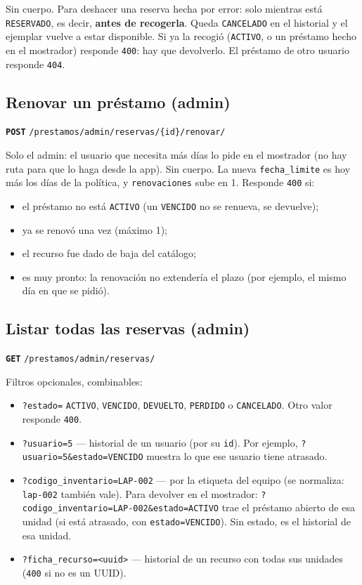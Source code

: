 \documentclass[11pt]{article}
\newcommand{\us}{\_\allowbreak}
\newcommand{\metodo}[2]{\textbf{\texttt{#1}} \texttt{#2}}
\begin{document}
Sin cuerpo. Para deshacer una reserva hecha por error: solo mientras est\'a \texttt{RESERVADO}, es decir, \textbf{antes de recogerla}. Queda \texttt{CANCELADO} en el historial y el ejemplar vuelve a estar disponible. Si ya la recogi\'o (\texttt{ACTIVO}, o un pr\'estamo hecho en el mostrador) responde \texttt{400}: hay que devolverlo. El pr\'estamo de otro usuario responde \texttt{404}.

\subsection*{Renovar un pr\'estamo (admin)}
\metodo{POST}{/prestamos/admin/reservas/\{id\}/renovar/}

Solo el admin: el usuario que necesita m\'as d\'ias lo pide en el mostrador (no hay ruta para que lo haga desde la app). Sin cuerpo. La nueva \texttt{fecha\us limite} es hoy m\'as los d\'ias de la pol\'itica, y \texttt{renovaciones} sube en 1. Responde \texttt{400} si:
\begin{itemize}
    \item el pr\'estamo no est\'a \texttt{ACTIVO} (un \texttt{VENCIDO} no se renueva, se devuelve);
    \item ya se renov\'o una vez (m\'aximo 1);
    \item el recurso fue dado de baja del cat\'alogo;
    \item es muy pronto: la renovaci\'on no extender\'ia el plazo (por ejemplo, el mismo d\'ia en que se pidi\'o).
\end{itemize}

\subsection*{Listar todas las reservas (admin)}
\metodo{GET}{/prestamos/admin/reservas/}

Filtros opcionales, combinables:
\begin{itemize}
    \item \texttt{?estado=} \texttt{ACTIVO}, \texttt{VENCIDO}, \texttt{DEVUELTO}, \texttt{PERDIDO} o \texttt{CANCELADO}. Otro valor responde \texttt{400}.
    \item \texttt{?usuario=5} --- historial de un usuario (por su \texttt{id}). Por ejemplo, \texttt{?usuario=5\&estado=VENCIDO} muestra lo que ese usuario tiene atrasado.
    \item \texttt{?codigo\us inventario=LAP-002} --- por la etiqueta del equipo (se normaliza: \texttt{lap-002} tambi\'en vale). Para devolver en el mostrador: \texttt{?codigo\us inventario=LAP-002\&estado=ACTIVO} trae el pr\'estamo abierto de esa unidad (si est\'a atrasado, con \texttt{estado=VENCIDO}). Sin estado, es el historial de esa unidad.
    \item \texttt{?ficha\us recurso=<uuid>} --- historial de un recurso con todas sus unidades (\texttt{400} si no es un UUID).
\end{itemize}
\end{document}
